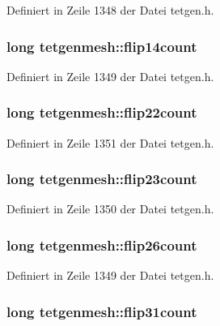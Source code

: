 Definiert in Zeile 1348 der Datei tetgen.\-h.

\hypertarget{classtetgenmesh_adb10987252049a6ea2f1959a5f0f2c50}{
\subsubsection[{flip14count}]{\setlength{\rightskip}{0pt plus 5cm}long tetgenmesh\-::flip14count}}\label{classtetgenmesh_adb10987252049a6ea2f1959a5f0f2c50}


Definiert in Zeile 1349 der Datei tetgen.\-h.

\hypertarget{classtetgenmesh_a3d8ebbb8bbacdd0d1cfc899cf40caab3}{
\subsubsection[{flip22count}]{\setlength{\rightskip}{0pt plus 5cm}long tetgenmesh\-::flip22count}}\label{classtetgenmesh_a3d8ebbb8bbacdd0d1cfc899cf40caab3}


Definiert in Zeile 1351 der Datei tetgen.\-h.

\hypertarget{classtetgenmesh_a3a939ba7f8ecfe66e9c7889126df3c92}{
\subsubsection[{flip23count}]{\setlength{\rightskip}{0pt plus 5cm}long tetgenmesh\-::flip23count}}\label{classtetgenmesh_a3a939ba7f8ecfe66e9c7889126df3c92}


Definiert in Zeile 1350 der Datei tetgen.\-h.

\hypertarget{classtetgenmesh_a5afc9b75a5a2418f795ff0ea13793f74}{
\subsubsection[{flip26count}]{\setlength{\rightskip}{0pt plus 5cm}long tetgenmesh\-::flip26count}}\label{classtetgenmesh_a5afc9b75a5a2418f795ff0ea13793f74}


Definiert in Zeile 1349 der Datei tetgen.\-h.

\hypertarget{classtetgenmesh_a1970580330b0ef8b71a6afb16a255a50}{
\subsubsection[{flip31count}]{\setlength{\rightskip}{0pt plus 5cm}long tetgenmesh\-::flip31count}}\label{classtetgenmesh_a1970580330b0ef8b71a6afb16a255a50}


